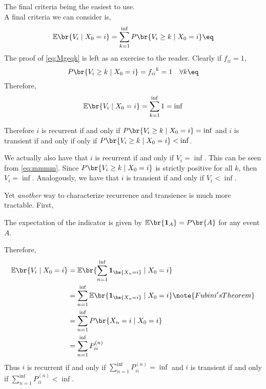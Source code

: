 \documentclass{article}
\newcommand{\Exp}{\mathbb{E}}
\newcommand{\ind}{\mathbf{1}}
\begin{document}
The final criteria being the easiest to use. \\

A final criteria we can consider is,
\[ \Exp\br{V_i \mid X_0 = i} = \sum_{k=1}^{\inf} P\br{V_i \geq k \mid X_0 = i} \eq \label{eq:Mgeqk}\]
The proof of \cref{eq:Mgeqk} is left as an exercise to the reader. Clearly if $f_{ii} = 1$,
\[ P\br{V_i \geq k \mid X_0 = i} = {f_{ii}}^k = 1 \quad \forall k \eq \label{eq:mmmm}\]
Therefore,
\[ \Exp\br{V_i \mid X_0 = i} = \sum_{k=1}^{\inf} 1 = \inf\]
\begin{theorem}
Therefore $i$ is recurrent if and only if $P\br{V_i \geq k \mid X_0 = i} = \inf$ and $i$ is transient if and only if only if $P\br{V_i \geq k \mid X_0 = i} < \inf$.
\end{theorem}
\begin{remark}
We actually also have that $i$ is recurrent if and only if $V_i = \inf$. This can be seen from \cref{eq:mmmm}. Since $P\br{V_i \geq k \mid X_0 = i}$ is strictly positive for all $k$, then $V_i = \inf$. Analogously, we have that $i$ is transient if and only if $V_i < \inf$.
\end{remark}
Yet \textit{another} way to characterize recurrence and transience is much more tractable. First,
\begin{theorem}
    The expectation of the indicator is given by $\Exp\br{\ind_{A}} = P\br{A}$ for any event $A$.
\end{theorem}
Therefore,
\begin{align*}
\Exp\br{V_i \mid X_0 = i} &= \Exp\br{\sum_{n=1}^{\inf} \ind_{\bs{X_n = i}} \mid X_0 = i} \\
&= \sum_{n=1}^{\inf}\Exp\br{ \ind_{\bs{X_n = i}} \mid X_0 = i} \note{Fubini's Theorem} \\
&= \sum_{n=1}^{\inf}P\br{ X_n = i \mid X_0 = i}\\
&= \sum_{n=1}^{\inf}P_{ii}^{(n)}
\end{align*}
Thus $i$ is recurrent if and only if $\sum_{n=1}^{\inf}P_{ii}^{(n)} = \inf$ and $i$ is transient if and only if $\sum_{n=1}^{\inf}P_{ii}^{(n)} < \inf$.\\
\end{document}
